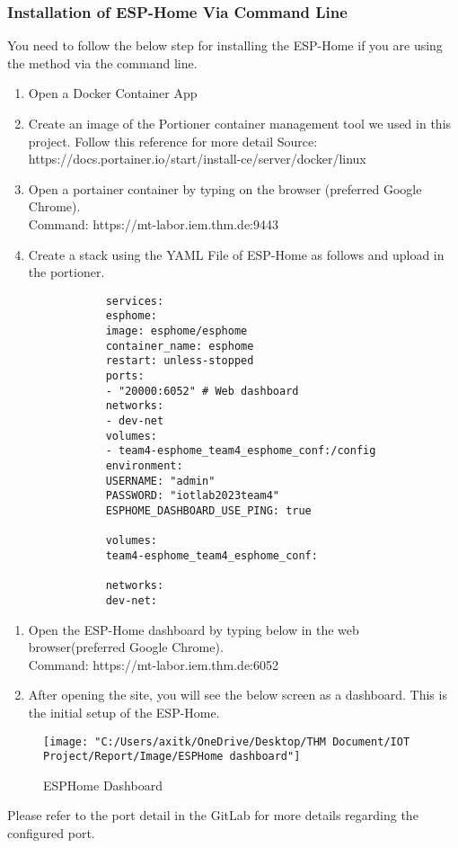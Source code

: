 \documentclass{article}
\begin{document}
	\subsubsection{Installation of ESP-Home Via Command Line}
	You need to follow the below step for installing the ESP-Home if you are using the method via the command line.
	\begin{enumerate}
		\item Open a Docker Container App
		\item Create an image of the Portioner container management tool we used in this project. Follow this reference for more detail Source: \\{https://docs.portainer.io/start/install-ce/server/docker/linux}
		\item Open a portainer container by typing on the browser (preferred Google Chrome). \\Command: {https://mt-labor.iem.thm.de:9443}
		\item Create a stack using the YAML File of ESP-Home as follows and upload in the portioner. 
		
		\begin{verbatim}
			services:
			esphome:
			image: esphome/esphome
			container_name: esphome
			restart: unless-stopped
			ports:
			- "20000:6052" # Web dashboard
			networks:
			- dev-net
			volumes:
			- team4-esphome_team4_esphome_conf:/config
			environment:
			USERNAME: "admin"
			PASSWORD: "iotlab2023team4"
			ESPHOME_DASHBOARD_USE_PING: true
			
			volumes:
			team4-esphome_team4_esphome_conf:
			
			networks:
			dev-net:
		\end{verbatim}
	\end{enumerate}
	
	
	\begin{enumerate}[resume]
		\item Open the ESP-Home dashboard by typing below in the web browser(preferred Google Chrome). \\Command: {https://mt-labor.iem.thm.de:6052}
		\item After opening the site, you will see the below screen as a dashboard. This is the initial setup of the ESP-Home.
	\end{enumerate}
	
	\begin{figure}[h]
		\centering
		\texttt{[image: "C:/Users/axitk/OneDrive/Desktop/THM Document/IOT Project/Report/Image/ESPHome dashboard"]}
		\caption{ESPHome Dashboard}
	\end{figure}
	
	Please refer to the port detail in the GitLab for more details regarding the configured port.
	
\end{document}
